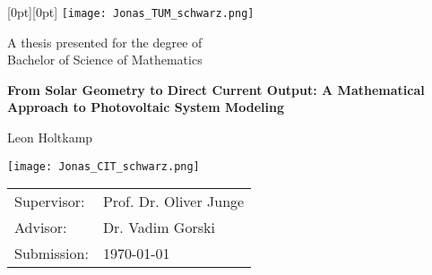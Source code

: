 \begin{titlepage}
    \sf

    \newsavebox{\textblock}

    \newlength{\textblockheight}
    \setlength{\textblockheight}{\ht\textblock}

    \noindent
    \begin{minipage}{\textwidth}
    \usebox{\textblock}%
    \hfill
    \raisebox{-15pt}[0pt][0pt]{
        \texttt{[image: Jonas\_TUM\_schwarz.png]}%
    }
    \end{minipage}

    \begin{center}
        
        \vspace*{6.5cm}
        
        \Large
        A thesis presented for the degree of \\
        Bachelor of Science of Mathematics

        \vspace*{0.8cm}
        
        \Large
        \textbf{From Solar Geometry to Direct Current Output: A Mathematical Approach to Photovoltaic System Modeling} 
            
        \vspace{1cm}
        
        \Large 
        Leon Holtkamp

        \vspace{1.3cm}
        
        \texttt{[image: Jonas\_CIT\_schwarz.png]}
    \end{center}
    \vspace*{\fill}
    
    \noindent
    \begin{tabular}{ll}
        Supervisor: & Prof. Dr. Oliver Junge \\
        Advisor:    & Dr. Vadim Gorski         \\
        Submission: & \today
    \end{tabular}
\end{titlepage}
